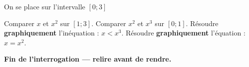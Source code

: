 \documentclass[12pt,a4paper]{exam}
\begin{document}
\vspace{5pt}
On se place sur l'intervalle $\left[0;3\right]$
\vspace{5pt}
\begin{questions}
    \question[1] Comparer $x$ et $x^2$ sur $\left[1;3\right]$.
    \question[1] Comparer $x^2$ et $x^3$ sur $\left[0;1\right]$.
    \question[2] Résoudre \textbf{graphiquement} l'inéquation : $x < x^3$.
    \question[2] Résoudre \textbf{graphiquement} l'équation : $x = x^2$.
\end{questions}

\noindent\hrulefill
\vspace{0.5cm}

\begin{center}
\textbf{Fin de l'interrogation — relire avant de rendre.}    
\end{center}
\end{document}
